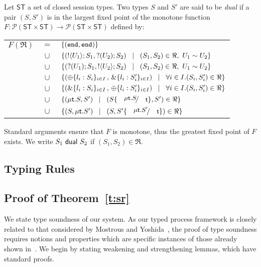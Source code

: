 \begin{definition}[Duality]
\label{def:dual}
Let $\mathsf{ST}$ a set of closed session types. 
Two types $S$ and $S'$ are said to be {\em dual} if a pair $(S,S')$ is 
in the largest fixed point of the monotone function
$F:\mathcal{P}(\mathsf{ST}\times \mathsf{ST}) \to 
\mathcal{P}(\mathsf{ST}\times \mathsf{ST})$ defined by:\\[1mm]
\begin{tabular}{rcl}
$F(\Re)$ &$\!\!=\!\!$&	$\{(\mathtt{end}, \mathtt{end})\}$\\
         &$\!\!\cup\!\!$&	$\{(! \langle U_1 \rangle ; S_1, ? (U_2) ; S_2)
\;\;\;|\;\;\;(S_1, S_2)\in \Re, \  U_1 \sim U_2 \}$\\ 
       &$\!\!\cup\!\!$&	$\{(? (U_1) ; S_1, ! \langle U_2 \rangle ; S_2)
\;\;\;|\;\;\;(S_1, S_2)\in \Re, \ U_1 \sim U_2\}$\\ 
	&$\!\!\cup\!\!$&	$\{(\oplus \{l_i: S_i\}_{i \in I} \,,\, \& \{l_i: S_i'\}_{i \in I}) \;\;\;|\;\;\; \forall i\in I. (S_i, S_i')\in \Re\}$\\
	&$\!\!\cup\!\!$&	$\{(\& \{l_i: S_i\}_{i \in I}\,,\, \oplus \{l_i: S_i'\}_{i \in I}) \;\;\;|\;\;\; \forall i\in I. (S_i, S_i')\in \Re\}$\\
	&$\!\!\cup\!\!$&	$\set{(\trec{t}{S}, S')
\bnfbar (S\subst{\trec{t}{S}}{\vart{t}},S')\in \Re}$\\
	&$\!\!\cup\!\!$&	$\set{(S,\trec{t}{S'})
\bnfbar (S,S'\subst{\trec{t}{S'}}{\vart{t}})\in \Re}$\\[1mm]
\end{tabular}

\noindent
Standard arguments ensure that $F$ is monotone, thus the greatest fixed point
of $F$ exists. We write $S_1 \ \mathsf{dual}\  S_2$ if  $(S_1,S_2)\in \Re$. 
\end{definition}

\smallskip 

\subsection{Typing Rules}




\subsection{Proof of Theorem~\ref{t:sr}}
We state type soundness of our system.
As our typed process framework is closely related to that considered
by Mostrous and Yoshida~\cite{MostrousY15}, the proof of type soundness requires notions
and properties which are specific instances of those already shown in~\cite{MostrousY15}.
We begin by stating weakening and strengthening lemmas,
which have standard proofs.

